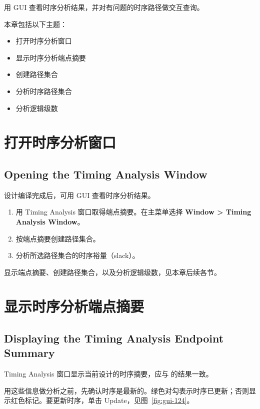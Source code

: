 \label{chap:gui-timing}

用 GUI 查看时序分析结果，并对有问题的时序路径做交互查询。

本章包括以下主题：
\begin{itemize}
  \item 打开时序分析窗口
  \item 显示时序分析端点摘要
  \item 创建路径集合
  \item 分析时序路径集合
  \item 分析逻辑级数
\end{itemize}

\section{打开时序分析窗口}
\subsection*{Opening the Timing Analysis Window}

设计编译完成后，可用 GUI 查看时序分析结果。

\begin{enumerate}
  \item 用 Timing Analysis 窗口取得端点摘要。在主菜单选择 \textbf{Window > Timing Analysis Window}。
  \item 按端点摘要创建路径集合。
  \item 分析所选路径集合的时序裕量（slack）。
\end{enumerate}

\begin{seeAlsoBox}
显示端点摘要、创建路径集合，以及分析逻辑级数，见本章后续各节。
\end{seeAlsoBox}

\section{显示时序分析端点摘要}
\subsection*{Displaying the Timing Analysis Endpoint Summary}

Timing Analysis 窗口显示当前设计的时序摘要，应与  的结果一致。

用这些信息做分析之前，先确认时序是最新的。绿色对勾表示时序已更新；否则显示红色标记。要更新时序，单击 Update，见图~\ref{fig:gui-124}。

